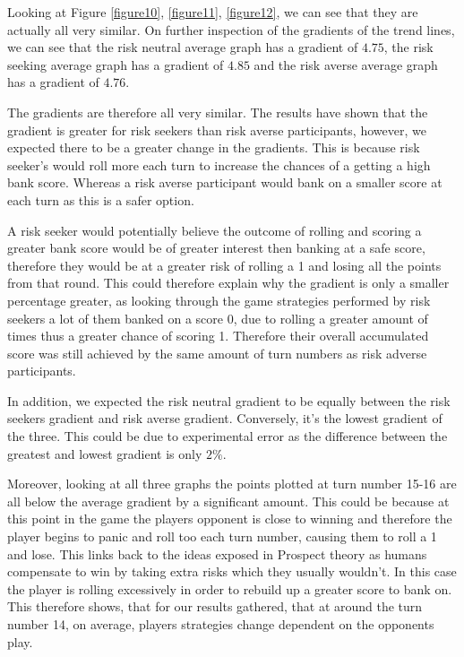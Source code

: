 \documentclass[a4paper,titlepage]{article}
\begin{document}
Looking at Figure \ref{figure10}, \ref{figure11}, \ref{figure12}, we can see that they are actually all very similar. On further inspection of the gradients of the trend lines, we can see that the risk neutral average graph has a gradient of $4.75$, the risk seeking average graph has a gradient of $4.85$ and the risk averse average graph has a gradient of $4.76$.

The gradients are therefore all very similar. The results have shown that the gradient is greater for risk seekers than risk averse participants, however, we expected there to be a greater change in the gradients. This is because risk seeker’s would roll more each turn to increase the chances of a getting a high bank score. Whereas a risk averse participant would bank on a smaller score at each turn as this is a safer option.

A risk seeker would potentially believe the outcome of rolling and scoring a greater bank score would be of greater interest then banking at a safe score, therefore they would be at a greater risk of rolling a 1 and losing all the points from that round. This could therefore explain why the gradient is only a smaller percentage greater, as looking through the game strategies performed by risk seekers a lot of them banked on a score 0, due to rolling a greater amount of times thus a greater chance of scoring 1. Therefore their overall accumulated score was still achieved by the same amount of turn numbers as risk adverse participants.

In addition, we expected the risk neutral gradient to be equally between the risk seekers gradient and risk averse gradient. Conversely, it’s the lowest gradient of the three. This could be due to experimental error as the difference between the greatest and lowest gradient is only $2\%$.

Moreover, looking at all three graphs the points plotted at turn number 15-16 are all below the average gradient by a significant amount. This could be because at this point in the game the players opponent is close to winning and therefore the player begins to panic and roll too each turn number, causing them to roll a 1 and lose. This links back to the ideas exposed in Prospect theory\cite{kahneman2013prospect} as humans compensate to win by taking extra risks which they usually wouldn’t. In this case the player is rolling excessively in order to rebuild up a greater score to bank on. This therefore shows, that for our results gathered, that at around the turn number 14, on average, players strategies change dependent on the opponents play.
\end{document}
